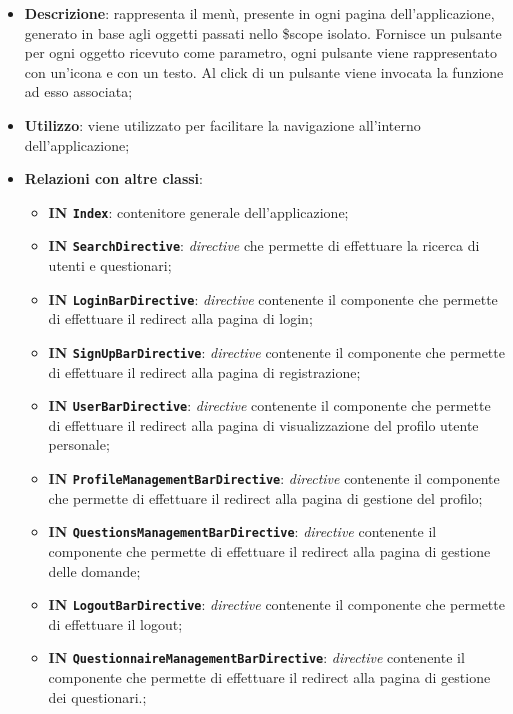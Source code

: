 		\begin{itemize}
			\item \textbf{Descrizione}: rappresenta il menù, presente in ogni pagina dell'applicazione,
generato in base agli oggetti passati nello \$scope isolato. Fornisce un
pulsante per ogni oggetto ricevuto come parametro, ogni pulsante viene
rappresentato con un'icona e con un testo. Al click di un pulsante viene
invocata la funzione ad esso associata;
			\item \textbf{Utilizzo}: viene utilizzato per facilitare la navigazione all'interno dell'applicazione;
			\item \textbf{Relazioni con altre classi}: 
			\begin{itemize}
				\item \textbf{IN \texttt{Index}}: contenitore generale dell'applicazione;
				\item \textbf{IN \texttt{SearchDirective}}: \textit{directive} che permette di effettuare la ricerca di utenti e questionari;
				\item \textbf{IN \texttt{LoginBarDirective}}: \textit{directive} contenente il componente che permette di effettuare il redirect alla pagina di login;
				\item \textbf{IN \texttt{SignUpBarDirective}}: \textit{directive} contenente il componente che permette di effettuare il redirect alla pagina di registrazione;
				\item \textbf{IN \texttt{UserBarDirective}}: \textit{directive} contenente il componente che permette di effettuare il redirect alla pagina di visualizzazione del profilo utente personale;
				\item \textbf{IN \texttt{ProfileManagementBarDirective}}: \textit{directive} contenente il componente che permette di effettuare il redirect alla pagina di gestione del profilo;
				\item \textbf{IN \texttt{QuestionsManagementBarDirective}}: \textit{directive} contenente il componente che permette di effettuare il redirect alla pagina di gestione delle domande;
				\item \textbf{IN \texttt{LogoutBarDirective}}: \textit{directive} contenente il componente che permette di effettuare il logout;
				\item \textbf{IN \texttt{QuestionnaireManagementBarDirective}}: \textit{directive} contenente il componente che permette di effettuare il redirect alla pagina di gestione dei questionari.;
			\end{itemize}

\end{itemize}
